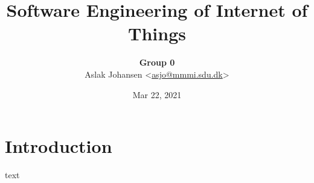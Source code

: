 \documentclass[a4paper]{article}
\begin{document}
\title{Software Engineering of Internet of Things\\\scalebox{.85}{Handin 0: Sampling Rate}}
\author{
    \textbf{Group 0} \\
    Aslak Johansen <\href{mailto:asjo@mmmi.sdu.dk}{asjo@mmmi.sdu.dk}>
}
\date{Mar 22, 2021}
\maketitle
\vspace{5mm}

\section{Introduction}

text
\end{document}
